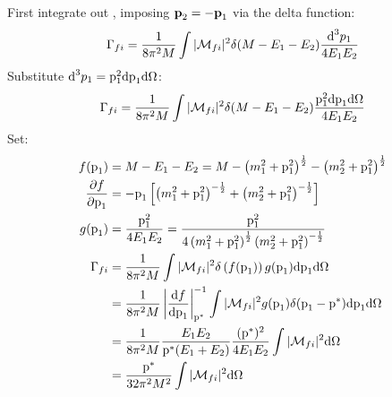 \begin{solution}
    First integrate out \pvecc, imposing $\textbf{p}_2 = -\textbf{p}_1$ via the delta function:
    \begin{align*}
        \Gamma_{fi} = \frac{1}{8\pi^2M} \int |\mathcal{M}_{fi}|^2
        \delta(M - E_1 - E_2)
        \frac{\text{d}^3p_1}{4E_1E_2}
    \end{align*}
    Substitute $\text{d}^3p_1 = \text{p}_1^2\text{d}\text{p}_1\text{d}\Omega$:
    \begin{align*}
        \Gamma_{fi} = \frac{1}{8\pi^2M} \int |\mathcal{M}_{fi}|^2
        \delta(M - E_1 - E_2)
        \frac{\text{p}_1^2\text{d}\text{p}_1\text{d}\Omega}{4E_1E_2}
    \end{align*}
    Set:
    \begin{align*}
        f(\text{p}_1)                          & = M-E_1-E_2 = M - \left(m_1^2+\text{p}_1^2\right)^\frac{1}{2}
        - \left(m_2^2+\text{p}_1^2\right)^\frac{1}{2}                                                         \\
        \frac{\partial f}{\partial \text{p}_1} & =
        -\text{p}_1\left[\left(m_1^2+\text{p}_1^2\right)^{-\frac{1}{2}}
        + \left(m_2^2+\text{p}_1^2\right)^{-\frac{1}{2}}\right]                                               \\
        g(\text{p}_1)                          & = \frac{\text{p}_1^2}{4E_1E_2}
        = \frac{\text{p}_1^2}{4\left(m_1^2+\text{p}_1^2\right)^\frac{1}{2}
        \left(m_2^2+\text{p}_1^2\right)^{-\frac{1}{2}}}                                                       \\
        \Gamma_{fi}                           & = \frac{1}{8\pi^2M} \int |\mathcal{M}_{fi}|^2
        \delta\left(f(\text{p}_1)\right) g(\text{p}_1) \text{d}\text{p}_1\text{d}\Omega                         \\
                                              & = \frac{1}{8\pi^2M}
        \left|\frac{\text{d}f}{\text{d}\text{p}_1}\right|_{\text{p}^{*}}^{-1}
        \int |\mathcal{M}_{fi}|^2
        g(\text{p}_1)\delta(\text{p}_1 - \text{p}^{*})\text{d}\text{p}_1\text{d}\Omega                          \\
                                              & = \frac{1}{8\pi^2M}
        \frac{E_1E_2}{\text{p}^{*}(E_1+E_2)} \frac{(\text{p}^{*})^2}{4E_1E_2}
        \int |\mathcal{M}_{fi}|^2\text{d}\Omega                                                              \\
                                              & = \frac{\text{p}^{*}}{32\pi^2M^2}
        \int |\mathcal{M}_{fi}|^2\text{d}\Omega
    \end{align*}
\end{solution}



